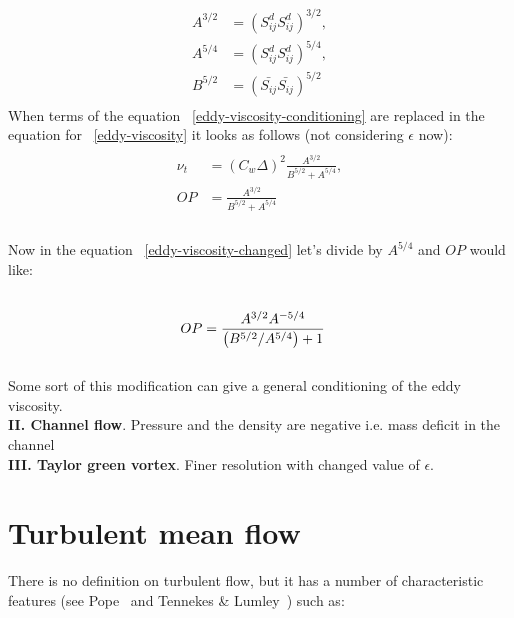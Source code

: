 \documentclass[a4paper]{article}
\def\sij{\bar{S_{ij}}}
\begin{document}
\begin{equation}
\label{eddy-viscosity-conditioning}
\begin{split}
A^{3/2} &= \left({S_{ij}^{d}}{S_{ij}^{d}}\right)^{3/2},\\ A^{5/4} &= \left({S_{ij}^{d}}{S_{ij}^{d}}\right)^{5/4},\\ B^{5/2} &= \left(\sij \sij\right)^{5/2}\\
\end{split}
\end{equation}
When terms of the equation ~\ref{eddy-viscosity-conditioning} are replaced in the equation for ~\ref{eddy-viscosity} it looks as follows (not considering $\epsilon$ now):
\begin{equation}
\label{eddy-viscosity-changed}
\begin{split}\\
{\nu_t} &= \left({C_w}{\Delta}\right)^{2}
\frac{A^{3/2}}{B^{5/2} + {A^{5/4}}},\\
{OP} &= \frac{A^{3/2}}{B^{5/2} + {A^{5/4}}}\\
\end{split}
\end{equation}\\
Now in the equation ~\ref{eddy-viscosity-changed} let's divide by ${A^{5/4}}$ and ${OP}$ would like:
\begin{equation}
\label{some_modification}
\begin{split}\\
{OP} &= \frac{A^{3/2}A^{\--5/4}}{\left(B^{5/2}\// {A^{5/4}}\right) + 1}\\
\end{split}
\end{equation}\\
Some sort of this modification can give a general conditioning of the eddy viscosity.\\
{\bf II. Channel flow}.  Pressure and the density are negative i.e. mass deficit in the channel\\
{\bf III. Taylor green vortex}. Finer resolution with changed value of $\epsilon$. 

\newpage


\section{Turbulent mean flow}

There is no definition on turbulent flow, but it has a number of characteristic
features (see Pope~\cite{pope:book} and Tennekes \& Lumley~\cite{tennekes:lumley}) such as:
\end{document}
